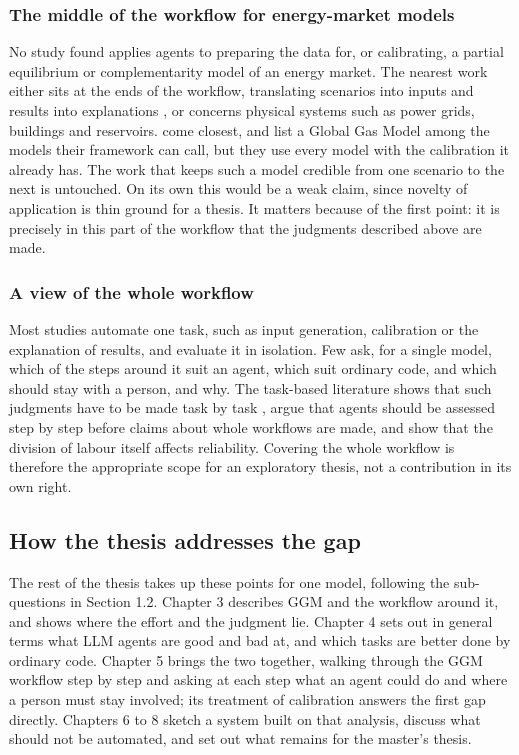 
\subsubsection{The middle of the workflow for energy-market models}

No study found applies agents to preparing the data for, or calibrating, a partial equilibrium or complementarity model of an energy market.
The nearest work either sits at the ends of the workflow, translating scenarios into inputs and results into explanations \citep{golden2026agentic, forootani2025re}, or concerns physical systems such as power grids, buildings and reservoirs.
\citet{golden2026agentic} come closest, and list a Global Gas Model among the models their framework can call, but they use every model with the calibration it already has.
The work that keeps such a model credible from one scenario to the next is untouched.
On its own this would be a weak claim, since novelty of application is thin ground for a thesis.
It matters because of the first point: it is precisely in this part of the workflow that the judgments described above are made.

\subsubsection{A view of the whole workflow}

Most studies automate one task, such as input generation, calibration or the explanation of results, and evaluate it in isolation.
Few ask, for a single model, which of the steps around it suit an agent, which suit ordinary code, and which should stay with a person, and why.
The task-based literature shows that such judgments have to be made task by task \citep{eloundou2024gpts, dellacqua2026navigating}, \citet{chen2025scienceagentbench} argue that agents should be assessed step by step before claims about whole workflows are made, and \citet{zhu2026human} show that the division of labour itself affects reliability.
Covering the whole workflow is therefore the appropriate scope for an exploratory thesis, not a contribution in its own right.

\subsection{How the thesis addresses the gap}

The rest of the thesis takes up these points for one model, following the sub-questions in Section 1.2.
Chapter 3 describes GGM and the workflow around it, and shows where the effort and the judgment lie.
Chapter 4 sets out in general terms what LLM agents are good and bad at, and which tasks are better done by ordinary code.
Chapter 5 brings the two together, walking through the GGM workflow step by step and asking at each step what an agent could do and where a person must stay involved; its treatment of calibration answers the first gap directly.
Chapters 6 to 8 sketch a system built on that analysis, discuss what should not be automated, and set out what remains for the master's thesis.
